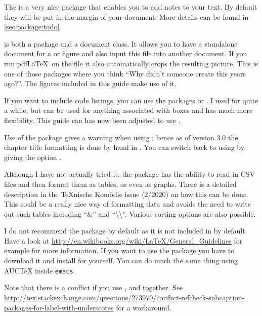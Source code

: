 The  is a very nice package that enables you to add notes to your text.
By default they will be put in the margin of your document.
More details can be found in \cref{sec:package:todo}.

 is both a package and a document class.
It allows you to have a standalone document for a  or  figure
and also input this file into another document. If you run pdf\LaTeX\
on the file it also automatically crops the resulting picture. This is
one of those packages where you think \enquote{Why didn't someone
  create this years ago?}. The \Package{tikz} figures included in this
guide make use of it.

If you want to include code listings,
you can use the packages  or .
I used \Package{listings} for quite a while,
but  can be used for anything associated with boxes and
has much more flexibility.
This guide can has now been adjusted to use .

Use of the  package gives a warning when using \KOMAScript{}; hence
as of version 3.0 the chapter title formatting is done by hand in .
You can switch back to using \Package{titlesec} by giving the option \Option{titlesec}.

Although I have not actually tried it,
the  package has the ability to read in CSV files and
then format them as tables, or even as graphs.
There is a detailed description in the \TeX nische Komödie issue (2/2020)
on how this can be done.
This could be a really nice way of formatting data
and avoids the need to write out such tables including \enquote{\&} and \enquote{\textbackslash\textbackslash}.
Various sorting options are also possible.

I do not recommend the  package by default as it is not
included in \TeXLive by default. Have a look at
\url{http://en.wikibooks.org/wiki/LaTeX/General_Guidelines} for
example for more information. If you want to use the package you have
to download it and install for yourself. You can do much the same
thing using AUCTeX inside \texttt{emacs}.

\begin{sloppypar}
Note that there is a conflict if you use ,  and  together.
See \url{http://tex.stackexchange.com/questions/273970/conflict-refcheck-subcaption-packages-for-label-with-underscores} for a workaround.
\end{sloppypar}

